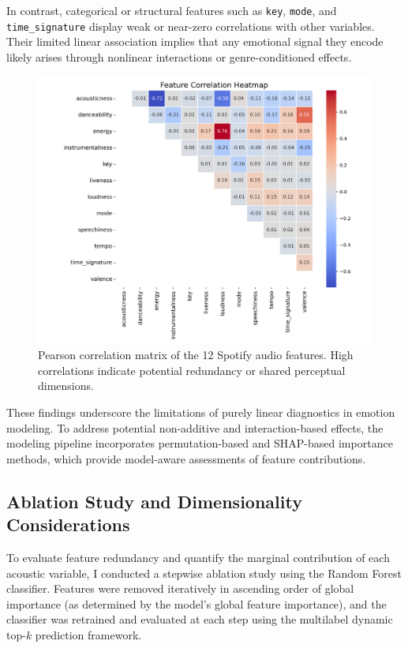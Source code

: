 \documentclass{article}
\begin{document}
In contrast, categorical or structural features such as \texttt{key}, \texttt{mode}, and \texttt{time\_signature} display weak or near-zero correlations with other variables. Their limited linear association implies that any emotional signal they encode likely arises through nonlinear interactions or genre-conditioned effects.

\begin{figure}[H]
\centering
\includegraphics[width=\textwidth]{Graphics/feature_correlation.png}
\caption{Pearson correlation matrix of the 12 Spotify audio features. High correlations indicate potential redundancy or shared perceptual dimensions.}
\label{fig:feature_correlation}
\end{figure}

These findings underscore the limitations of purely linear diagnostics in emotion modeling. To address potential non-additive and interaction-based effects, the modeling pipeline incorporates permutation-based and SHAP-based importance methods, which provide model-aware assessments of feature contributions.

\subsection{Ablation Study and Dimensionality Considerations}

To evaluate feature redundancy and quantify the marginal contribution of each acoustic variable, I conducted a stepwise ablation study using the Random Forest classifier. Features were removed iteratively in ascending order of global importance (as determined by the model’s global feature importance), and the classifier was retrained and evaluated at each step using the multilabel dynamic top-$k$ prediction framework.
\end{document}
